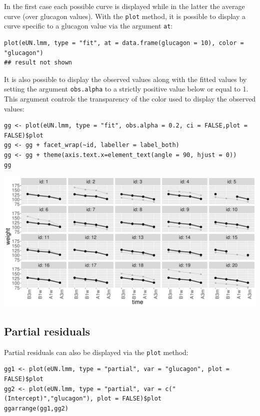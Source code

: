 \documentclass[12pt]{article}
\begin{document}
In the first case each possible curve is displayed while in the latter
the average curve (over glucagon values). With the \texttt{plot} method,
it is possible to display a curve specific to a glucagon value via the
argument \texttt{at}:
\lstset{language=r,label= ,caption= ,captionpos=b,numbers=none}
\begin{lstlisting}
plot(eUN.lmm, type = "fit", at = data.frame(glucagon = 10), color = "glucagon")
## result not shown
\end{lstlisting}

It is also possible to display the observed values along with the
fitted values by setting the argument \texttt{obs.alpha} to a strictly
positive value below or equal to 1. This argument controls the
transparency of the color used to display the observed values:
\lstset{language=r,label= ,caption= ,captionpos=b,numbers=none}
\begin{lstlisting}
gg <- plot(eUN.lmm, type = "fit", obs.alpha = 0.2, ci = FALSE,plot = FALSE)$plot
gg <- gg + facet_wrap(~id, labeller = label_both)
gg <- gg + theme(axis.text.x=element_text(angle = 90, hjust = 0))
gg
\end{lstlisting}

\begin{center}
\includegraphics[width=\textwidth]{./figures/fit-autoplot-indiv.pdf}
\end{center}

\clearpage

\subsection{Partial residuals}
\label{sec:org3a72fb1}

Partial residuals can also be displayed via the \texttt{plot} method:
\lstset{language=r,label= ,caption= ,captionpos=b,numbers=none}
\begin{lstlisting}
gg1 <- plot(eUN.lmm, type = "partial", var = "glucagon", plot = FALSE)$plot
gg2 <- plot(eUN.lmm, type = "partial", var = c("(Intercept)","glucagon"), plot = FALSE)$plot
ggarrange(gg1,gg2)
\end{lstlisting}
\end{document}
